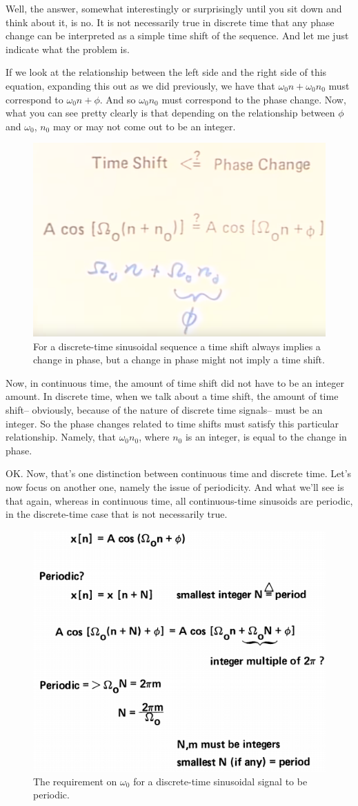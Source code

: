 \documentclass[fleqn,10pt]{olplainarticle}
\theoremstyle{definition}
\theoremstyle{remark}
\begin{document}
Well, the answer, somewhat interestingly or surprisingly until you sit down and think about it, is no. It is not necessarily true in discrete time that any phase change can be interpreted as a simple time shift of the sequence. And let me just indicate what the problem is.

If we look at the relationship between the left side and the right side of this equation, expanding this out as we did previously, we have that $\omega_0 n + \omega_0 n_0$ must correspond to $\omega_0 n + \phi$. And so $\omega_0 n_0$ must correspond to the phase change. Now, what you can see pretty clearly is that depending on the relationship between $\phi$ and $\omega_0$, $n_0$ may or may not come out to be an integer.

\begin{figure}[ht]
	\centering
	\includegraphics[width=0.4\linewidth]{images/signals_09.png}
	\caption{For a discrete-time sinusoidal sequence a time shift always implies a change in phase, but a change in phase might not imply a time shift.}
	\label{fig:signals_09}
\end{figure}

Now, in continuous time, the amount of time shift did not have to be an integer amount. In discrete time, when we talk about a time shift, the amount of time shift-- obviously, because of the nature of discrete time signals-- must be an integer. So the phase changes related to time shifts must satisfy this particular relationship. Namely, that $\omega_0 n_0$, where $n_0$ is an integer, is equal to the change in phase.

OK. Now, that's one distinction between continuous time and discrete time. Let's now focus on another one, namely the issue of periodicity. And what we'll see is that again, whereas in continuous time, all continuous-time sinusoids are periodic, in the discrete-time case that is not necessarily true.

\begin{figure}[ht]
	\centering
	\includegraphics[width=0.5\linewidth]{images/signals_10.png}
	\caption{The requirement on $\omega_0$ for a discrete-time sinusoidal signal to be periodic.}
	\label{fig:signals_10}
\end{figure}
\end{document}
